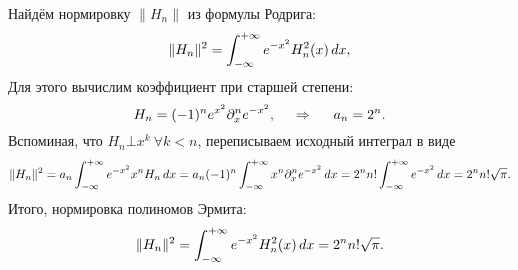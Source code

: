 Найдём нормировку $\|H_n\|$ из формулы Родрига:
\begin{equation*}
    \|H_n\|^2 = \int_{-\infty}^{+\infty} e^{-x^2} H_n^2(x) \, d x,
\end{equation*}
Для этого вычислим коэффициент при старшей степени:
\begin{equation*}
    H_n = (-1)^n e^{x^2} \partial_x^n e^{-x^2},
    \hspace{0.5cm} \Rightarrow \hspace{0.5cm}  
    a_n = 2^n.
\end{equation*}
Вспоминая, что $H_n \bot x^k \ \forall k < n$, переписываем исходный интеграл в виде
\begin{equation*}
    \|H_n\|^2 = a_n \int_{-\infty}^{+\infty} e^{-x^2} x^n H_n \, d x = a_n (-1)^n \int_{-\infty}^{+\infty} x^n \partial_x^n e^{-x^2} \, d x =2^n n! \int_{-\infty}^{+\infty} e^{-x^2} \, d x =  2^n n!  \sqrt{\pi}.
\end{equation*}
Итого, нормировка полиномов Эрмита:
\begin{equation*}
    \|H_n\|^2  = \int_{-\infty}^{+\infty} e^{-x^2} H_n^2(x) \, d x = 2^n n!  \sqrt{\pi}.
\end{equation*}